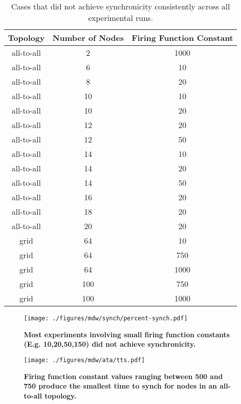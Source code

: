 \begin{table}[t]
\begin{center}
\begin{tabular}{|c|c|c|} \hline
Topology & Number of Nodes & Firing Function Constant \\ \hline \hline
all-to-all &  2  &  1000 \\
all-to-all &  6  &  10 \\
all-to-all &  8  &  20 \\ 
all-to-all &  10 &  10 \\
all-to-all &  10 &  20 \\
all-to-all &  12 &  20 \\
all-to-all &  12 &  50 \\
all-to-all &  14 &  10 \\
all-to-all &  14 &  20 \\ 
all-to-all &  14 &  50 \\
all-to-all &  16 &  20 \\
all-to-all &  18 &  20 \\
all-to-all &  20 &  20 \\ 
grid       &  64 &  10 \\
grid       &  64 &  750 \\
grid       &  64 &  1000 \\
grid       &  100 &  750 \\
grid       &  100 &  1000 \\ \hline \hline
\end{tabular}
\end{center}
\caption{{\small Cases that did not achieve synchronicity consistently across all experimental runs.}}
\label{table:nosync}
\end{table}


\begin{figure}[p]
\begin{center}
\texttt{[image: ./figures/mdw/synch/percent-synch.pdf]}
\end{center}
\caption{{\small {\bf Most experiments involving small firing function constants (E.g. 10,20,50,150) did not achieve synchronicity.}}}
\label{fig:alltts}
\end{figure}

\begin{figure}[p]
\begin{center}
\texttt{[image: ./figures/mdw/ata/tts.pdf]}
\end{center}
\caption{{\small {\bf Firing function constant values ranging between 500 and 750 produce the smallest time to synch for nodes in an all-to-all topology.}}}
\label{fig:alltts}
\end{figure}


